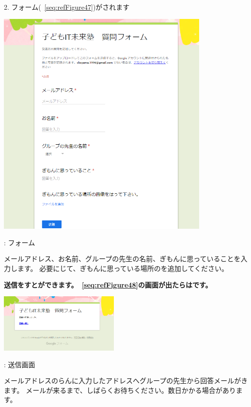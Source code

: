 \documentclass[a4paper,12pt]{jarticle}
\begin{document}
2.
フォーム(~\ref{seq:refFigure47})がされます

\centering
\begin{minipage}{\textwidth}
  {\upshape
    \includegraphics[width=0.8\textwidth]{textbook-img246.png}
    \flushleft

    \bigskip
    {\theFigure\label{seq:refFigure47}}: フォーム}
\end{minipage}
\flushleft

\bigskip

メールアドレス、お名前、グループの先生の名前、ぎもんに思っていることを入力します。
必要にじて、ぎもんに思っている場所のを追加してください。

{\bfseries
送信\textmd{をすとができます。~\ref{seq:refFigure48}の画面が出たらはです。}}



\centering
\begin{minipage}{\textwidth}
  {\upshape
    \includegraphics[width=0.45\textwidth]{textbook-img247.png}
    \flushleft

    \bigskip
    {\theFigure\label{seq:refFigure48}}: 送信画面}
\end{minipage}
\flushleft
メールアドレスのらんに入力したアドレスへグループの先生から回答メールがきます。
メールが来るまで、しばらくお待ちください。数日かかる場合があります。
\end{document}
